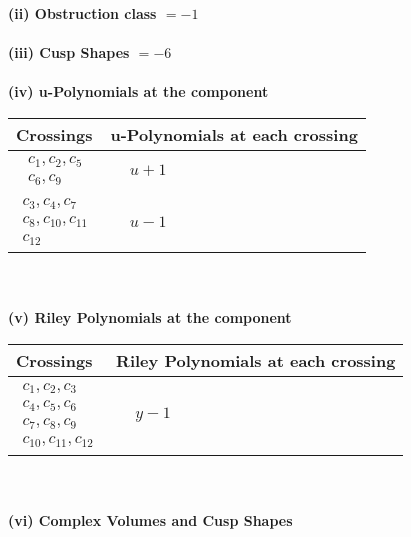 \documentclass[1p]{elsarticle_modified}
\theoremstyle{definition}
\begin{document}
\flushleft \textbf{(ii) Obstruction class $= -1$}\\~\\
\flushleft \textbf{(iii) Cusp Shapes $= -6$}\\~\\
\newpage\renewcommand{\arraystretch}{1}
\flushleft \textbf{(iv) u-Polynomials at the component}\newline \\
\begin{tabular}{m{50pt}|m{274pt}}
Crossings & \hspace{64pt}u-Polynomials at each crossing \\
\hline $$\begin{aligned}c_{1},c_{2},c_{5}\\c_{6},c_{9}\end{aligned}$$&$\begin{aligned}
&u+1
\end{aligned}$\\
\hline $$\begin{aligned}c_{3},c_{4},c_{7}\\c_{8},c_{10},c_{11}\\c_{12}\end{aligned}$$&$\begin{aligned}
&u-1
\end{aligned}$\\
\hline
\end{tabular}\\~\\
\newpage\renewcommand{\arraystretch}{1}
\flushleft \textbf{(v) Riley Polynomials at the component}\newline \\
\begin{tabular}{m{50pt}|m{274pt}}
Crossings & \hspace{64pt}Riley Polynomials at each crossing \\
\hline $$\begin{aligned}c_{1},c_{2},c_{3}\\c_{4},c_{5},c_{6}\\c_{7},c_{8},c_{9}\\c_{10},c_{11},c_{12}\end{aligned}$$&$\begin{aligned}
&y-1
\end{aligned}$\\
\hline
\end{tabular}\\~\\
\newpage\flushleft \textbf{(vi) Complex Volumes and Cusp Shapes}
\end{document}
